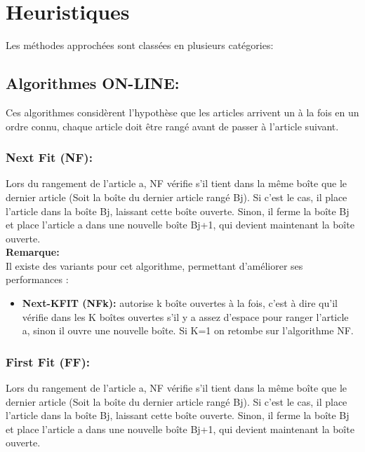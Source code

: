 \documentclass[class=report, crop=false]{standalone}
\begin{document}
        \section{Heuristiques}
        Les méthodes approchées  sont classées en plusieurs catégories:
        \subsection{Algorithmes ON-LINE:}
        Ces algorithmes considèrent l’hypothèse que les articles arrivent un à la fois en un ordre connu, chaque article doit être rangé avant de passer à l’article suivant.
        \subsubsection{Next Fit (NF):} Lors du rangement de l’article a, NF vérifie s'il tient dans la même boîte que le dernier article (Soit la boîte du dernier article rangé Bj). Si c’est le cas, il place l’article dans la boîte Bj, laissant cette boîte ouverte. Sinon, il ferme la boîte Bj et place l’article a dans une nouvelle boîte Bj+1, qui devient maintenant la boîte ouverte. 
        \\ \textbf{Remarque:} \\
        Il existe des variants pour cet algorithme, permettant d’améliorer ses performances : 
        \begin{itemize}
            \item \textbf{Next-KFIT (NFk): } autorise k boîte ouvertes à la fois, c’est à dire qu’il vérifie dans les K boîtes ouvertes s’il y a assez d’espace pour ranger l’article a, sinon il ouvre une nouvelle boîte. Si K=1 on retombe sur l’algorithme NF.
        \end{itemize}
        \subsubsection{First Fit (FF): } Lors du rangement de l’article a, NF vérifie s'il tient dans la même boîte que le dernier article (Soit la boîte du dernier article rangé Bj). Si c’est le cas, il place l’article dans la boîte Bj, laissant cette boîte ouverte. Sinon, il ferme la boîte Bj et place l’article a dans une nouvelle boîte Bj+1, qui devient maintenant la boîte ouverte. 
\end{document}
